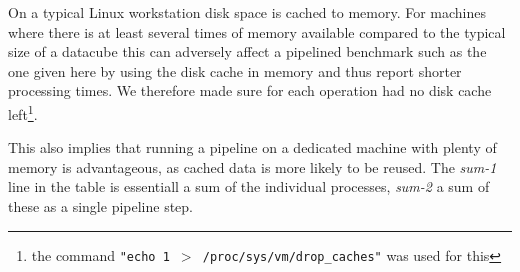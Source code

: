 \documentclass{article}
\begin{document}
On a typical Linux workstation disk space is cached to memory. For
machines where there is at least several times of memory available
compared to the typical size of a datacube this can adversely affect
a pipelined benchmark such as the one given here by using the
disk cache in memory and thus report shorter processing times.
We therefore made sure
for each operation had no disk cache left\footnote{the command
{\tt "echo 1 $>$ /proc/sys/vm/drop\_caches"} was used for this}.


This also implies that running a pipeline on a dedicated machine
with plenty of memory is advantageous, as cached data is more likely
to be reused. The {\it sum-1} line in the table is essentiall
a sum of the individual processes, {\it sum-2} a sum of 
these as a single pipeline step.
\end{document}
